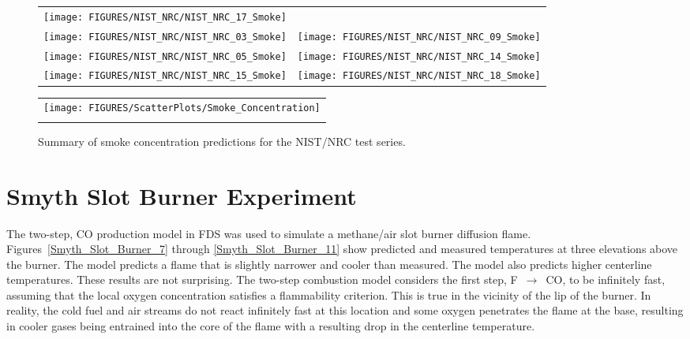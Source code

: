 \begin{figure}[p]
\begin{tabular*}{\textwidth}{l@{\extracolsep{\fill}}r}
\texttt{[image: FIGURES/NIST\_NRC/NIST\_NRC\_17\_Smoke]} &
 \\
\texttt{[image: FIGURES/NIST\_NRC/NIST\_NRC\_03\_Smoke]} &
\texttt{[image: FIGURES/NIST\_NRC/NIST\_NRC\_09\_Smoke]} \\
\texttt{[image: FIGURES/NIST\_NRC/NIST\_NRC\_05\_Smoke]} &
\texttt{[image: FIGURES/NIST\_NRC/NIST\_NRC\_14\_Smoke]} \\
\texttt{[image: FIGURES/NIST\_NRC/NIST\_NRC\_15\_Smoke]} &
\texttt{[image: FIGURES/NIST\_NRC/NIST\_NRC\_18\_Smoke]}
\end{tabular*}
\end{figure}



\begin{figure}[p]
\begin{center}
\begin{tabular}{c}
\texttt{[image: FIGURES/ScatterPlots/Smoke\_Concentration]} \\
\vspace{0.25in} \\
\end{tabular}
\end{center}
\caption[Summary of smoke concentration predictions, NIST/NRC test series]
{Summary of smoke concentration predictions for the NIST/NRC test series.}
\end{figure}



\clearpage

\section{Smyth Slot Burner Experiment}

The two-step, CO production model in FDS was used to simulate a methane/air slot burner diffusion flame.
Figures~\ref{Smyth_Slot_Burner_7} through \ref{Smyth_Slot_Burner_11}
show predicted and measured temperatures at three elevations above the burner.  The model predicts a flame that is slightly narrower
and cooler than measured.  The model
also predicts higher centerline temperatures.  These results are not surprising.  The two-step combustion model considers
the first step, F~$\longrightarrow$~CO, to be infinitely fast, assuming that the local oxygen concentration satisfies a
flammability criterion.  This is true in the vicinity of the lip of the burner.  In reality, the cold fuel and air
streams do not react infinitely fast at this location and some oxygen penetrates the flame at the base, resulting in cooler
gases being entrained into the core of the flame with a resulting drop in the centerline temperature.

